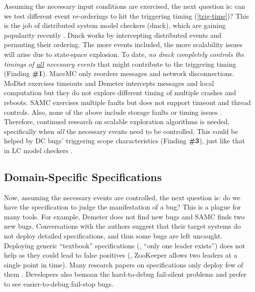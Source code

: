 Assuming the necessary input conditions are exercised, the next
question is: can we test different event re-orderings to hit the
triggering timing (\sec\ref{trig-time})?  This is the job of
distributed system model checkers (dmck), which are gaining popularity
recently \cite{Guo+11-Demeter, 
Killian+07-LifeDeathMaceMC,
  Leesatapornwongsa+14-Samc, Simsa+10-Dbug,
  Yang+09-Modist}.  Dmck works by intercepting distributed events and
permuting their ordering.  The more events included, the more
scalability issues will arise due to state-space explosion.
%
To date, {\em no dmck completely controls the timings of
  \underline{all} necessary events} that might contribute to the
triggering timing (Finding {\bf \#1}).  MaceMC
\cite{Killian+07-LifeDeathMaceMC} only reorders messages and network
disconnections.  MoDist \cite{Guo+11-Demeter} exercises timeouts and
Demeter \cite{Guo+11-Demeter} intercepts messages and local
computation but they do not explore different timing of multiple
crashes and reboots.  SAMC \cite{Leesatapornwongsa+14-Samc} exercises
multiple faults but does not support timeout and thread controls.
Also, none of the above include storage faults
or timing issues \cite{Hao+16-TailAtStore}.
%
Therefore, continued research on scalable exploration algorithms is
needed, specifically 
when {\em all} the necessary events need to be controlled.
This could be helped by DC bugs' triggering scope characteristics
(Finding {\bf \#3}), just like that in
LC model checkers \cite{madanpldi07}.


\subsection{Domain-Specific Specifications}
\label{less-spec}

Now, assuming the necessary events are controlled, the next question
is: do we have the specification to judge the manifestation of a bug?  
This is a plague for many tools.  For example,
Demeter does not find new bugs \cite{Guo+11-Demeter} and SAMC
\cite{Leesatapornwongsa+14-Samc} finds two new bugs.
Conversations with the authors suggest that their target systems do
not deploy detailed specifications, and thus some bugs are left
uncaught.  Deploying generic ``textbook'' specifications (\eg, ``only
one leader exists'') does not help as they could lead to false
positives (\eg, ZooKeeper allows two leaders at a single point in
time).  Many research papers on specifications only deploy few of them
\cite{Gunawi+11-FateDestini, Liu+08-D3S, Reynolds+06-Pip}.
Developers also
bemoan the hard-to-debug fail-silent problems  and
prefer to see easier-to-debug fail-stop bugs.  
%


